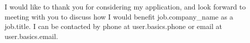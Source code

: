 I would like to thank you for considering my application, and look forward to meeting with you to discuss how I would benefit {{job.company_name}} as a {{job.title}}. I can be contacted by phone at {{user.basics.phone}} or email at {{user.basics.email}}.
